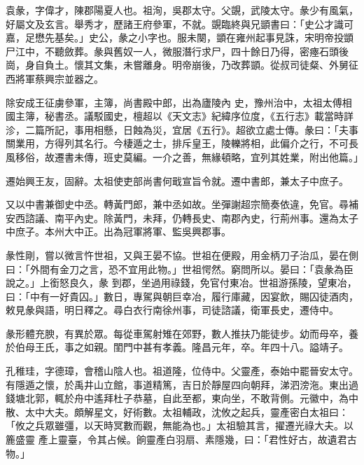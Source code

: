 
\begin{pinyinscope}

 袁彖，字偉才，陳郡陽夏人也。祖洵，吳郡太守。父覬，武陵太守。彖少有風氣，好屬文及玄言。舉秀才，歷諸王府參軍，不就。覬臨終與兄顗書曰：「史公才識可嘉，足懋先基矣。」史公，彖之小字也。服未闋，顗在雍州起事見誅，宋明帝投顗尸江中，不聽斂葬。彖與舊奴一人，微服潛行求尸，四十餘日乃得，密瘞石頭後崗，身自負土。懷其文集，未嘗離身。明帝崩後，乃改葬顗。從叔司徒粲、外舅征西將軍蔡興宗並器之。



 除安成王征虜參軍，主簿，尚書殿中郎，出為廬陵內
 史，豫州治中，太祖太傅相國主簿，秘書丞。議駁國史，檀超以《天文志》紀緯序位度，《五行志》載當時詳沴，二篇所記，事用相懸，日蝕為災，宜居《五行》。超欲立處士傳。彖曰：「夫事關業用，方得列其名行。今棲遁之士，排斥皇王，陵轢將相，此偏介之行，不可長風移俗，故遷書未傳，班史莫編。一介之善，無緣頓略，宜列其姓業，附出他篇。」



 遷始興王友，固辭。太祖使吏部尚書何戢宣旨令就。遷中書郎，兼太子中庶子。



 又以中書兼御史中丞。轉黃門郎，兼中丞如故。坐彈謝超宗簡奏依違，免官。尋補安西諮議、南平內史。除黃門，未拜，仍轉長史、南郡內史，行荊州事。還為太子中庶子。本州大中正。出為冠軍將軍、監吳興郡事。



 彖性剛，嘗以微言忤世祖，又與王晏不協。世祖在便殿，用金柄刀子治瓜，晏在側曰：「外間有金刀之言，恐不宜用此物。」世祖愕然。窮問所以。晏曰：「袁彖為臣說之。」上銜怒良久，彖
 到郡，坐過用祿錢，免官付東冶。世祖游孫陵，望東冶，曰：「中有一好貴囚。」數日，專駕與朝巨幸冶，履行庫藏，因宴飲，賜囚徒酒肉，敕見彖與語，明日釋之。尋白衣行南徐州事，司徒諮議，衛軍長史，遷侍中。



 彖形體充腴，有異於眾。每從車駕射雉在郊野，數人推扶乃能徒步。幼而母卒，養於伯母王氏，事之如親。閨門中甚有孝義。隆昌元年，卒。年四十八。謚靖子。



 孔稚珪，字德璋，會稽山陰人也。祖道隆，位侍中。父靈產，泰始中罷晉安太守。有隱遁之懷，於禹井山立館，事道精篤，吉日於靜屋四向朝拜，涕泗滂沲。東出過錢塘北郭，輒於舟中遙拜杜子恭墓，自此至都，東向坐，不敢背側。元徽中，為中散、太中大夫。頗解星文，好術數。太祖輔政，沈攸之起兵，靈產密白太祖曰：「攸之兵眾雖彊，以天時冥數而觀，無能為也。」太祖驗其言，擢遷光祿大夫。以簏盛靈
 產上靈臺，令其占候。餉靈產白羽扇、素隱幾，曰：「君性好古，故遺君古物。」




\end{pinyinscope}
